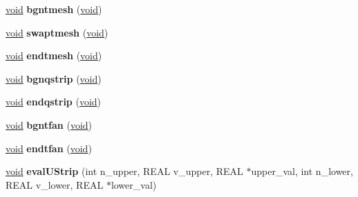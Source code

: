 \begin{DoxyCompactItemize}
\item 
\mbox{\label{class_open_g_l_surface_evaluator_a0dce60503f8080e1cff2fc4710681dfe}} 
\hyperlink{interfacevoid}{void} {\bfseries bgntmesh} (\hyperlink{interfacevoid}{void})
\item 
\mbox{\label{class_open_g_l_surface_evaluator_ac1f83837e4508d4869903f879d48dfdc}} 
\hyperlink{interfacevoid}{void} {\bfseries swaptmesh} (\hyperlink{interfacevoid}{void})
\item 
\mbox{\label{class_open_g_l_surface_evaluator_ab031af8caac73139932f49622e08198f}} 
\hyperlink{interfacevoid}{void} {\bfseries endtmesh} (\hyperlink{interfacevoid}{void})
\item 
\mbox{\label{class_open_g_l_surface_evaluator_a11d75a3192ca094e4b28786fb9202949}} 
\hyperlink{interfacevoid}{void} {\bfseries bgnqstrip} (\hyperlink{interfacevoid}{void})
\item 
\mbox{\label{class_open_g_l_surface_evaluator_a6c55de7d432b349e0d8312157091807b}} 
\hyperlink{interfacevoid}{void} {\bfseries endqstrip} (\hyperlink{interfacevoid}{void})
\item 
\mbox{\label{class_open_g_l_surface_evaluator_a4df099e279d2b5ab476ed8645c5246e4}} 
\hyperlink{interfacevoid}{void} {\bfseries bgntfan} (\hyperlink{interfacevoid}{void})
\item 
\mbox{\label{class_open_g_l_surface_evaluator_a2af3100f0c7aa8f6b2fcd052379ef6e3}} 
\hyperlink{interfacevoid}{void} {\bfseries endtfan} (\hyperlink{interfacevoid}{void})
\item 
\mbox{\label{class_open_g_l_surface_evaluator_af82d39649f671f30e51744ce424ad9f7}} 
\hyperlink{interfacevoid}{void} {\bfseries eval\+U\+Strip} (int n\+\_\+upper, R\+E\+AL v\+\_\+upper, R\+E\+AL $\ast$upper\+\_\+val, int n\+\_\+lower, R\+E\+AL v\+\_\+lower, R\+E\+AL $\ast$lower\+\_\+val)
\item 
\mbox{\label{class_open_g_l_surface_evaluator_a09882f5aca561d17ef155e4fc25324c5}} 

\end{DoxyCompactItemize}
